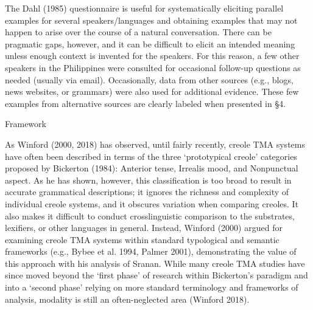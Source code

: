 \begin{styleStandard}
The Dahl (1985) questionnaire is useful for systematically eliciting parallel examples for several speakers/languages and obtaining examples that may not happen to arise over the course of a natural conversation. There can be pragmatic gaps, however, and it can be difficult to elicit an intended meaning unless enough context is invented for the speakers. For this reason, a few other speakers in the Philippines were consulted for occasional follow-up questions as needed (usually via email). Occasionally, data from other sources (e.g., blogs, news websites, or grammars) were also used for additional evidence. These few examples from alternative sources are clearly labeled when presented in §4.
\end{styleStandard}

\begin{listWWNumiiileveli}
\item 
\begin{listWWNumiiilevelii}
\item 
\begin{stylelsSectionii}
Framework
\end{stylelsSectionii}
\end{listWWNumiiilevelii}
\end{listWWNumiiileveli}
\begin{styleStandard}
As Winford (2000, 2018) has observed, until fairly recently, creole TMA systems have often been described in terms of the three ‘prototypical creole’ categories proposed by Bickerton (1984): Anterior tense, Irrealis mood, and Nonpunctual aspect. As he has shown, however, this classification is too broad to result in accurate grammatical descriptions; it ignores the richness and complexity of individual creole systems, and it obscures variation when comparing creoles. It also makes it difficult to conduct crosslinguistic comparison to the substrates, lexifiers, or other languages in general. Instead, Winford (2000) argued for examining creole TMA systems within standard typological and semantic frameworks (e.g., Bybee et al. 1994, Palmer 2001), demonstrating the value of this approach with his analysis of Sranan. While many creole TMA studies have since moved beyond the ‘first phase’ of research within Bickerton’s paradigm and into a ‘second phase’ relying on more standard terminology and frameworks of analysis, modality is still an often-neglected area (Winford 2018).
\end{styleStandard}

